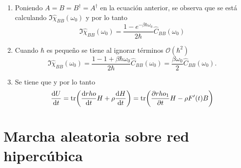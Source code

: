 \documentclass{article}
\begin{document}
\begin{enumerate}
\item Poniendo $A=B=B^\dagger=A^\dagger$ en la ecuación anterior, se observa que se está calculando $\Im\hat{\chi}_{BB}(\omega_0)$ y por lo tanto
\begin{equation}
\Im\hat{\chi}_{BB}(\omega_0)=\frac{1-e^{-\beta\hbar\omega_0}}{2\hbar}\hat{C}_{BB}(\omega_0)
\end{equation}

\item Cuando $\hbar$ es pequeño se tiene al ignorar términos $\mathcal{O}(\hbar^2)$
\begin{equation}
\Im\hat{\chi}_{BB}(\omega_0)=\frac{1-1+\beta\hbar\omega_0}{2\hbar}\hat{C}_{BB}(\omega_0)=\frac{\beta\omega_0}{2}\hat{C}_{BB}(\omega_0).
\end{equation}

\item Se tiene que y por lo tanto
\begin{align}
\begin{split}
\dv{U}{t}=\tr(\dv{rho}{t}H+\rho\dv{H}{t})=\tr(\pdv{rho_1}{t}H-\rho F'(t)B)
\end{split}
\end{align}

\end{enumerate}

\section{Marcha aleatoria sobre red hipercúbica}
\end{document}
